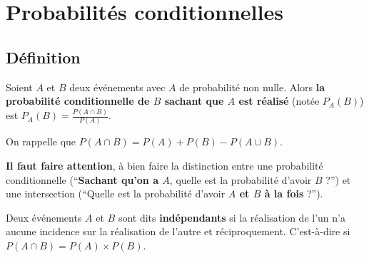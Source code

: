






	\section{Probabilités conditionnelles}

	\subsection{Définition}

	\begin{formula}[Définition]
		Soient $A$ et $B$ deux événements avec $A$ de probabilité non nulle. Alors \textbf{la probabilité conditionnelle de $B$ sachant que $A$ est réalisé} (notée $P_{A}(B)$) est $P_{A}(B) = \frac{P(A \cap B)}{P(A)}$.
	\end{formula}

	\begin{tip}[Rappel]
		On rappelle que $P(A \cap B) = P(A) + P(B) - P(A \cup B)$.
	\end{tip}

	\begin{tip}
		\textbf{Il faut faire attention}, à bien faire la distinction entre une probabilité conditionnelle (``\textbf{Sachant qu'on a $A$}, quelle est la probabilité d'avoir $B$ ?'') et une intersection (``Quelle est la probabilité d'avoir \textbf{$A$ et $B$ à la fois} ?'').
	\end{tip}

	\begin{formula}[Indépendance]
		Deux événements $A$ et $B$ sont dits \textbf{indépendants} si la réalisation de l'un n'a aucune incidence sur la réalisation de l'autre et réciproquement. C'est-à-dire si $P(A \cap B) = P(A) \times P(B)$.
	\end{formula}

